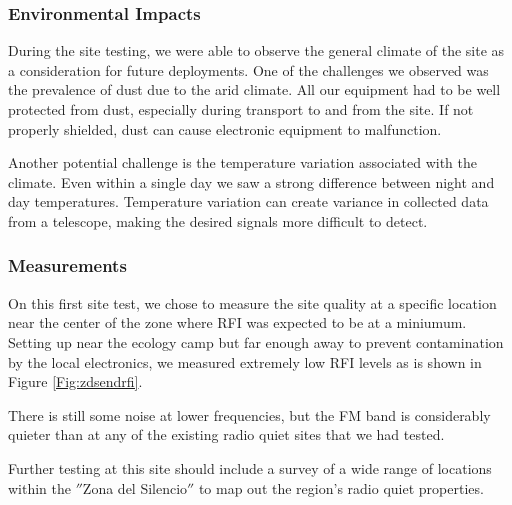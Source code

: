 \subsubsection{Environmental Impacts}

During the site testing, we were able to observe the general climate of the site as a consideration for future deployments. One of the challenges we observed was the prevalence of dust due to the arid climate. All our equipment had to be well protected from dust, especially during transport to and from the site. If not properly shielded, dust can cause electronic equipment to malfunction. 

Another potential challenge is the temperature variation associated with the climate. Even within a single day we saw a strong difference between night and day temperatures. Temperature variation can create variance in collected data from a telescope, making the desired signals more difficult to detect. 

\subsubsection{Measurements}

On this first site test, we chose to measure the site quality at a specific location near the center of the zone where RFI was expected to be at a miniumum. Setting up near the ecology camp but far enough away to prevent contamination by the local electronics, we measured extremely low RFI levels as is shown in Figure \ref{Fig:zdsendrfi}.

There is still some noise at lower frequencies, but the FM band is considerably quieter than at any of the existing radio quiet sites that we had tested. 

Further testing at this site should include a survey of a wide range of locations within the $''$Zona del Silencio$''$ to map out the region's radio quiet properties. 

